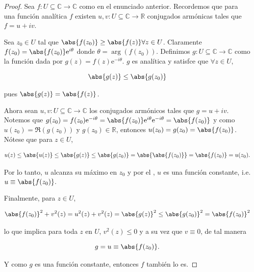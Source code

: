 \documentclass[../main.tex]{subfiles}
\begin{document}
\begin{proof}
    Sea \(f \colon U \subseteq \mathbb{C} \to \mathbb{C}\) como en el enunciado
    anterior. Recordemos que para una función analítica \(f\) existen \(u,v \colon U
    \subseteq \mathbb{C} \to \mathbb{R}\) conjugados armónicas tales que \(f = u + iv\).

    Sea \(z_{0}\in U\) tal que \(\abs{f(z_{0})} \geq \abs{f(z)} \forall z\in
    U\). Claramente
    \(f(z_{0}) = \abs{f(z_{0})}\mathrm{e}^{i\theta}\) donde \(\theta = \arg(f(z_{0}))\).
    Definimos \(g \colon U \subseteq \mathbb{C} \to \mathbb{C}\) como la función dada
    por \(g(z) = f(z) \mathrm{e}^{-i\theta}\). \(g\) es analítica y satisfce que
    \(\forall z\in U\),

    \begin{equation*}
        \abs{g(z)} \leq \abs{g(z_{0})}
    \end{equation*}

    pues \(\abs{g(z)} = \abs{f(z)}\).

    Ahora sean \(u,v \colon U \subseteq \mathbb{C} \to \mathbb{C}\) los
    conjugados armónicos
    tales que \(g = u + iv\). Notemos que \(g(z_{0}) = f(z_{0})\mathrm{e}^{-i\theta} =
    \abs{f(z_{0})}\mathrm{e}^{i\theta}\mathrm{e}^{-i\theta} = \abs{f(z_{0})}\) y como
    \(u(z_{0}) = \Re(g(z_{0}))\) y \(g(z_{0})\in \mathbb{R}\), entonces \(u(z_{0}) =
    g(z_{0}) = \abs{f(z_{0})}\). Nótese que para \(z\in U\),

    \begin{equation*}
        u(z) \leq \abs{u(z)} \leq \abs{g(z)} \leq \abs{g(z_{0})} =
        \abs{\abs{f(z_{0})}} =
        \abs{f(z_{0})} = u(z_{0}).
    \end{equation*}

    Por lo tanto, \(u\) alcanza su máximo en \(z_{0}\) y por el
    , \(u\) es una
    función constante, i.e. \(u \equiv \abs{f(z_{0})}\).

    Finalmente, para \(z\in U\),

    \begin{equation*}
        \abs{f(z_{0})}^{2} + v^{2}(z) = u^{2}(z) + v^{2}(z) = \abs{g(z)}^{2} \leq
        \abs{g(z_{0})}^{2} = \abs{f(z_{0})}^{2}
    \end{equation*}

    lo que implica para toda \(z\) en \(U\), \(v^{2}(z) \leq 0\) y a su vez
    que \(v \equiv
    0\), de tal manera

    \begin{equation*}
        g = u \equiv \abs{f(z_{0})}.
    \end{equation*}

    Y como \(g\) es una función constante, entonces \(f\) también lo es.
\end{proof}
\end{document}
